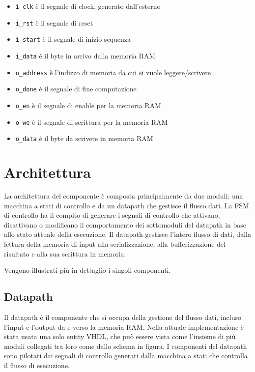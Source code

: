 \documentclass[12pt, a4paper]{article}
\begin{document}
\begin{itemize}
    \item \texttt{i\_clk} è il segnale di clock, generato dall'esterno
    \item \texttt{i\_rst} è il segnale di reset
    \item \texttt{i\_start} è il segnale di inizio sequenza
    \item \texttt{i\_data} è il byte in arrivo dalla memoria RAM
    \item \texttt{o\_address} è l'indizzo di memoria da cui si vuole leggere/scrivere
    \item \texttt{o\_done} è il segnale di fine computazione
    \item \texttt{o\_en} è il segnale di enable per la memoria RAM
    \item \texttt{o\_we} è il segnale di scrittura per la memoria RAM
    \item \texttt{o\_data} è il byte da scrivere in memoria RAM
\end{itemize}

\pagebreak

\section{Architettura}

La architettura del componente è composta principalmente da due moduli: una macchina a stati di controllo
e da un datapath che gestisce il flusso dati.
La FSM di controllo ha il compito di generare i segnali di controllo che attivano, disattivano o modificano
il comportamento dei sottomoduli del datapath in base allo stato attuale della esecuzione.
Il datapath gestisce l'intero flusso di dati, dalla lettura della memoria di input alla serializzazione, 
alla bufferizzazione del risultato e alla sua scrittura in memoria.

\noindent Vengono illustrati più in dettaglio i singoli componenti.

\subsection{Datapath}

Il datapath è il componente che si occupa della gestione del flusso dati, incluso l'input e l'output
da e verso la memoria RAM.
Nella attuale implementazione è stata usata una solo entity VHDL, che può essere vista come l'insieme
di più moduli collegati tra loro come dallo schema in figura.
I componenti del datapath sono pilotati dai segnali di controllo generati dalla macchina a stati che
controlla il flusso di esecuzione.
\end{document}
